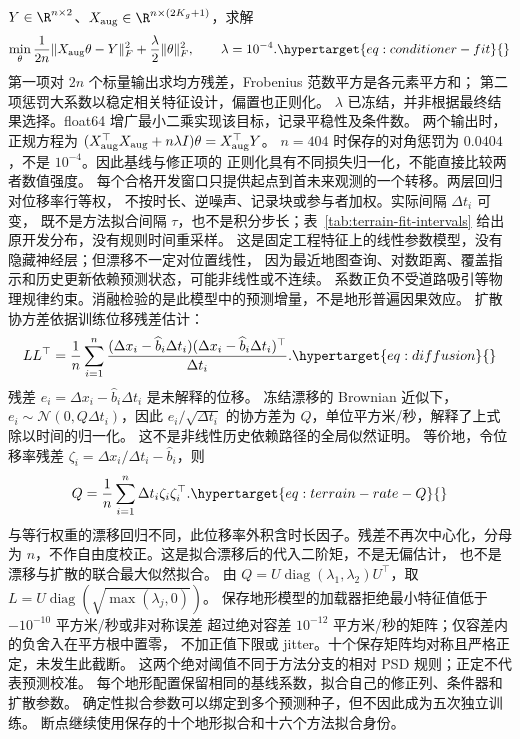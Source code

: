 \(Y\in\R^{n\times2}\)、\(X_{\rm aug}\in\R^{n\times(2K_g+1)}\)，求解
\begin{equation}
\min_\theta\frac{1}{2n}\|X_{\rm aug}\theta-Y\|_F^2
 +\frac{\lambda}{2}\|\theta\|_F^2,\qquad\lambda=10^{-4}.
\label{eq:conditioner-fit}\hypertarget{eq:conditioner-fit}{}
\end{equation}
第一项对 \(2n\) 个标量输出求均方残差，Frobenius 范数平方是各元素平方和；
第二项惩罚大系数以稳定相关特征设计，偏置也正则化。
\(\lambda\) 已冻结，并非根据最终结果选择。float64 增广最小二乘实现该目标，记录平稳性及条件数。
两个输出时，正规方程为
\((X_{\rm aug}^\top X_{\rm aug}+n\lambda I)\theta=X_{\rm aug}^\top Y\)。
\(n=404\) 时保存的对角惩罚为 \(0.0404\)，不是 \(10^{-4}\)。因此基线与修正项的
正则化具有不同损失归一化，不能直接比较两者数值强度。
每个合格开发窗口只提供起点到首未来观测的一个转移。两层回归对位移率行等权，
不按时长、逆噪声、记录块或参与者加权。实际间隔 \(\Delta t_i\) 可变，
既不是方法拟合间隔 \(\tau\)，也不是积分步长；表~\ref{tab:terrain-fit-intervals}
给出原开发分布，没有规则时间重采样。
这是固定工程特征上的线性参数模型，没有隐藏神经层；但漂移不一定对位置线性，
因为最近地图查询、对数距离、覆盖指示和历史更新依赖预测状态，可能非线性或不连续。
系数正负不受道路吸引等物理规律约束。消融检验的是此模型中的预测增量，不是地形普遍因果效应。
扩散协方差依据训练位移残差估计：
\begin{equation}
LL^\top=\frac1n\sum_{i=1}^{n}
\frac{(\Delta x_i-\widehat b_i\Delta t_i)(\Delta x_i-\widehat b_i\Delta t_i)^\top}{\Delta t_i}.
\label{eq:diffusion}\hypertarget{eq:diffusion}{}
\end{equation}
残差 \(e_i=\Delta x_i-\widehat b_i\Delta t_i\) 是未解释的位移。
冻结漂移的 Brownian 近似下，\(e_i\sim\mathcal N(0,Q\Delta t_i)\)，因此
\(e_i/\sqrt{\Delta t_i}\) 的协方差为 \(Q\)，单位平方米/秒，解释了上式除以时间的归一化。
这不是非线性历史依赖路径的全局似然证明。
等价地，令位移率残差 \(\zeta_i=\Delta x_i/\Delta t_i-\widehat b_i\)，则
\begin{equation}
Q=\frac1n\sum_{i=1}^n\Delta t_i\zeta_i\zeta_i^\top.
\label{eq:terrain-rate-Q}\hypertarget{eq:terrain-rate-Q}{}
\end{equation}
与等行权重的漂移回归不同，此位移率外积含时长因子。残差不再次中心化，分母为
\(n\)，不作自由度校正。这是拟合漂移后的代入二阶矩，不是无偏估计，
也不是漂移与扩散的联合最大似然拟合。
由 \(Q=U\operatorname{diag}(\lambda_1,\lambda_2)U^\top\)，取
\(L=U\operatorname{diag}(\sqrt{\max(\lambda_j,0)})\)。
保存地形模型的加载器拒绝最小特征值低于 \(-10^{-10}\) 平方米/秒或非对称误差
超过绝对容差 \(10^{-12}\) 平方米/秒的矩阵；仅容差内的负舍入在平方根中置零，
不加正值下限或 jitter。十个保存矩阵均对称且严格正定，未发生此截断。
这两个绝对阈值不同于方法分支的相对 PSD 规则；正定不代表预测校准。
每个地形配置保留相同的基线系数，拟合自己的修正列、条件器和扩散参数。
确定性拟合参数可以绑定到多个预测种子，但不因此成为五次独立训练。
断点继续使用保存的十个地形拟合和十六个方法拟合身份。

